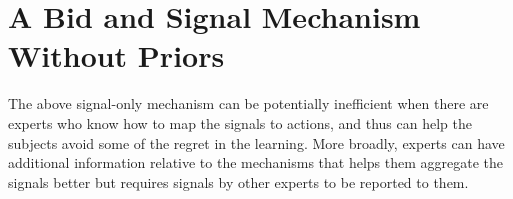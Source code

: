 






	




\section{A Bid and Signal Mechanism Without Priors}



The above signal-only mechanism can be potentially inefficient when there are experts who know how to map the signals to actions, and thus can help the subjects avoid some of the regret in the learning.
More broadly, experts can have additional information relative to the mechanisms that helps them aggregate the signals better but requires signals by other experts to be reported to them. 

